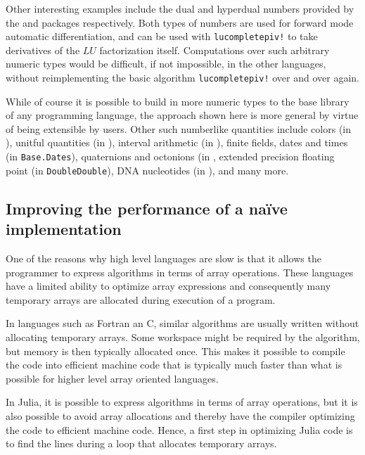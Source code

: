 Other interesting examples include the dual and hyperdual numbers provided by
the  and  packages
respectively. Both types of numbers are used for forward mode automatic
differentiation, and can be used with \lstinline|lucompletepiv!| to take
derivatives of the $LU$ factorization itself. Computations over such arbitrary
numeric types would be difficult, if not impossible, in the other languages,
without reimplementing the basic algorithm \lstinline|lucompletepiv!| over and
over again.

While of course it is possible to build in more numeric types to the base
library of any programming language, the approach shown here is more general
by virtue of being extensible by users. Other such numberlike quantities
include colors (in ), unitful quantities (in
), interval arithmetic (in ),
finite fields, dates and times (in \lstinline|Base.Dates|), quaternions and
octonions (in , extended precision floating point (in
\lstinline|DoubleDouble|), DNA nucleotides (in ), and many
more.



\subsection{Improving the performance of a na\"ive implementation}
One of the reasons why high level languages are slow is that it allows the programmer to express algorithms in terms of array operations. These languages have a limited ability to optimize array expressions and consequently many temporary arrays are allocated during execution of a program.

In languages such as Fortran an C, similar algorithms are usually written without allocating temporary arrays. Some workspace might be required by the algorithm, but memory is then typically allocated once. This makes it possible to compile the code into efficient machine code that is typically much faster than what is possible for higher level array oriented languages.

In Julia, it is possible to express algorithms in terms of array operations, but it is also possible to avoid array allocations and thereby have the compiler optimizing the code to efficient machine code. Hence, a first step in optimizing Julia code is to find the lines during a loop that allocates temporary arrays.

